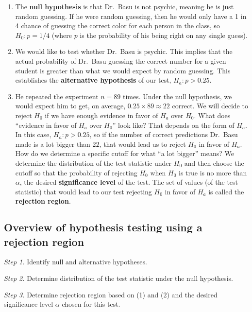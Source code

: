 \documentclass[]{article}
\begin{document}
\begin{enumerate}
\def\labelenumi{\arabic{enumi})}
\item
  The \textbf{null hypothesis} is that Dr.~Basu is not psychic, meaning
  he is just random guessing. If he were random guessing, then he would
  only have a 1 in 4 chance of guessing the correct color for each
  person in the class, so \(H_0:p=1/4\) (where \(p\) is the probability
  of his being right on any single guess).
\item
  We would like to test whether Dr.~Basu is psychic. This implies that
  the actual probability of Dr.~Basu guessing the correct number for a
  given student is greater than what we would expect by random guessing.
  This establishes the \textbf{alternative hypothesis} of our test,
  \(H_a: p > 0.25\).
\item
  He repeated the experiment \(n=89\) times. Under the null hypothesis,
  we would expect him to get, on average, \(0.25 \times 89\approx22\)
  correct. We will decide to reject \(H_0\) if we have enough evidence
  in favor of \(H_a\) over \(H_0\). What does ``evidence in favor of
  \(H_a\) over \(H_0\)'' look like? That depends on the form of \(H_a\).
  In this case, \(H_a:p>0.25\), so if the number of correct predictions
  Dr.~Basu made is a lot bigger than \(22\), that would lead us to
  reject \(H_0\) in favor of \(H_a\). How do we determine a specific
  cutoff for what ``a lot bigger'' means? We determine the distribution
  of the test statistic under \(H_0\) and then choose the cutoff so that
  the probability of rejecting \(H_0\) when \(H_0\) is true is no more
  than \(\alpha\), the desired \textbf{significance level} of the test.
  The set of values (of the test statistic) that would lead to our test
  rejecting \(H_0\) in favor of \(H_a\) is called the \textbf{rejection
  region}.
\end{enumerate}

\hypertarget{overview-of-hypothesis-testing-using-a-rejection-region}{%
\subsection{Overview of hypothesis testing using a rejection
region}\label{overview-of-hypothesis-testing-using-a-rejection-region}}

\emph{Step 1.} Identify null and alternative hypotheses.

\emph{Step 2.} Determine distribution of the test statistic under the
null hypothesis.

\emph{Step 3.} Determine rejection region based on (1) and (2) and the
desired significance level \(\alpha\) chosen for this test.
\end{document}

